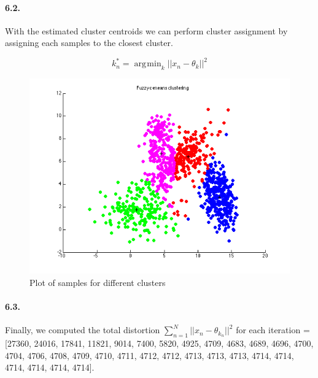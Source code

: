 \documentclass[a4paper]{article}
\DeclareMathOperator*{\argmin}{\arg\!\min}
\begin{document}
\paragraph{6.2.} With the estimated cluster centroids we can perform cluster assignment by assigning each samples to the closest cluster.

\begin{equation}
	k_n^* = \argmin_k ||x_n - \theta_k||^2
\end{equation}

	\begin{figure}[H]
		\centering
			\includegraphics[scale=.55]{images/clusters_plot.png}
		\caption{Plot of samples for different clusters}
	\end{figure}

\paragraph{6.3.} Finally, we computed the total distortion $\sum_{n=1}^N ||x_n-\theta_{k_n}||^2$ for each iteration = [27360, 24016, 17841, 11821, 9014, 7400, 5820, 4925, 4709, 4683, 4689, 4696, 4700, 4704, 4706, 4708, 4709, 4710, 4711, 4712, 4712, 4713, 4713, 4713, 4714, 4714, 4714, 4714, 4714, 4714].
\end{document}
